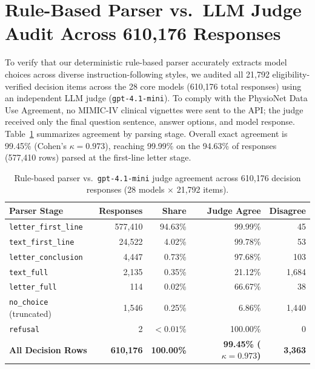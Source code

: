 \documentclass[11pt]{article}
\begin{document}
\section{Rule-Based Parser vs.\ LLM Judge Audit Across 610,176 Responses}
\label{app:judge}

To verify that our deterministic rule-based parser accurately extracts model choices across diverse instruction-following styles, we audited all 21,792 eligibility-verified decision items across the 28 core models (610,176 total responses) using an independent LLM judge (\texttt{gpt-4.1-mini}). To comply with the PhysioNet Data Use Agreement, no MIMIC-IV clinical vignettes were sent to the API; the judge received only the final question sentence, answer options, and model response. Table~\ref{tab:app_judge_stages} summarizes agreement by parsing stage. Overall exact agreement is 99.45\% (Cohen's $\kappa = 0.973$), reaching 99.99\% on the 94.63\% of responses (577,410 rows) parsed at the first-line letter stage.

\begin{table}[ht]
\centering
\scriptsize
\setlength{\tabcolsep}{4.0pt}
\begin{tabular}{@{}lrrrr@{}}
\toprule
\textbf{Parser Stage} & \textbf{Responses} & \textbf{Share} & \textbf{Judge Agree} & \textbf{Disagree} \\
\midrule
\texttt{letter\_first\_line} & 577,410 & 94.63\% & 99.99\% & 45 \\
\texttt{text\_first\_line} & 24,522 & 4.02\% & 99.78\% & 53 \\
\texttt{letter\_conclusion} & 4,447 & 0.73\% & 97.68\% & 103 \\
\texttt{text\_full} & 2,135 & 0.35\% & 21.12\% & 1,684 \\
\texttt{letter\_full} & 114 & 0.02\% & 66.67\% & 38 \\
\texttt{no\_choice} (truncated) & 1,546 & 0.25\% & 6.86\% & 1,440 \\
\texttt{refusal} & 2 & $<0.01\%$ & 100.00\% & 0 \\
\midrule
\textbf{All Decision Rows} & \textbf{610,176} & \textbf{100.00\%} & \textbf{99.45\% ($\kappa=0.973$)} & \textbf{3,363} \\
\bottomrule
\end{tabular}
\caption{Rule-based parser vs.\ \texttt{gpt-4.1-mini} judge agreement across 610,176 decision responses (28 models $\times$ 21,792 items).}
\label{tab:app_judge_stages}
\end{table}
\end{document}
